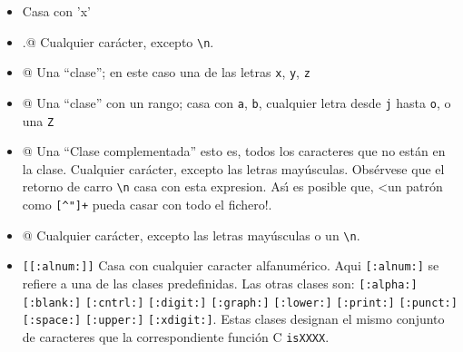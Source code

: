 \begin{itemize}
\item
\verb@x@	      Casa con 'x'
\item
\verb@.@	      Cualquier car\'acter, excepto \verb|\n|.
\item
\verb@[xyz]@      Una ``clase''; en este caso una de las letras \verb'x', \verb'y', \verb'z'
\item
\verb@[abj-oZ]@   Una ``clase'' con un rango; casa con  \verb'a',  \verb'b', cualquier letra desde  \verb'j' hasta \verb'o', o una \verb'Z'
\item
\verb@[^A-Z]@     Una ``Clase complementada'' esto es, todos los caracteres que no est\'an en la clase. Cualquier car\'acter, excepto las letras may\'usculas. Obs\'ervese que el retorno de carro \verb|\n| casa
con esta expresion. As\'{\i} es posible que, <un patr\'on como \verb|[^"]+| pueda casar con todo el fichero!.
\item
\verb@[^A-Z\n]@   Cualquier car\'acter, excepto las letras may\'usculas o un \verb|\n|.
\item

\verb|[[:alnum:]]| Casa con cualquier caracter alfanum\'erico. Aqui \verb|[:alnum:]| se refiere a una de las clases predefinidas. Las otras clases son: \verb|[:alpha:]| \verb|[:blank:]| \verb|[:cntrl:]| \verb|[:digit:]| \verb|[:graph:]| \verb|[:lower:]| \verb|[:print:]| \verb|[:punct:]| \verb|[:space:]| \verb|[:upper:]| \verb|[:xdigit:]|. Estas clases designan el mismo conjunto de caracteres que la correspondiente funci\'on C \verb|isXXXX|.


\end{itemize}
